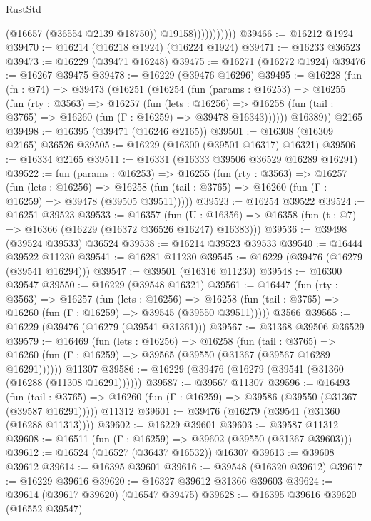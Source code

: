 \begin{lexlean}{RustStd}
\begin{coremodule}
                          (@16657 (@36554 @2139 @18750))
                          @19158)))))))))))
@39466 := @16212 @1924
@39470 := @16214 (@16218 @1924) (@16224 @1924)
@39471 := @16233 @36523
@39473 := @16229 (@39471 @16248)
@39475 := @16271 (@16272 @1924)
@39476 := @16267 @39475
@39478 := @16229 (@39476 @16296)
@39495 := @16228
    (fun (fn : @74) =>
    @39473
      (@16251
        (@16254
          (fun (params : @16253) =>
          @16255
            (fun (rty : @3563) =>
            @16257
              (fun (lets : @16256) =>
              @16258 (fun (tail : @3765) => @16260 (fun (Γ : @16259) => @39478 @16343))))))
        @16389))
    @2165
@39498 := @16395 (@39471 (@16246 @2165))
@39501 := @16308 (@16309 @2165) @36526
@39505 := @16229 (@16300 (@39501 @16317) @16321)
@39506 := @16334 @2165
@39511 := @16331 (@16333 @39506 @36529 @16289 @16291)
@39522 := fun (params : @16253) =>
  @16255
    (fun (rty : @3563) =>
    @16257
      (fun (lets : @16256) =>
      @16258 (fun (tail : @3765) => @16260 (fun (Γ : @16259) => @39478 (@39505 @39511)))))
@39523 := @16254 @39522
@39524 := @16251 @39523
@39533 := @16357
    (fun (U : @16356) => @16358 (fun (t : @7) => @16366 (@16229 (@16372 @36526 @16247) @16383)))
@39536 := @39498 (@39524 @39533) @36524
@39538 := @16214 @39523 @39533
@39540 := @16444 @39522 @11230
@39541 := @16281 @11230
@39545 := @16229 (@39476 (@16279 (@39541 @16294)))
@39547 := @39501 (@16316 @11230)
@39548 := @16300 @39547
@39550 := @16229 (@39548 @16321)
@39561 := @16447
    (fun (rty : @3563) =>
    @16257
      (fun (lets : @16256) =>
      @16258 (fun (tail : @3765) => @16260 (fun (Γ : @16259) => @39545 (@39550 @39511)))))
    @3566
@39565 := @16229 (@39476 (@16279 (@39541 @31361)))
@39567 := @31368 @39506 @36529
@39579 := @16469
    (fun (lets : @16256) =>
    @16258
      (fun (tail : @3765) =>
      @16260 (fun (Γ : @16259) => @39565 (@39550 (@31367 (@39567 @16289 @16291))))))
    @11307
@39586 := @16229 (@39476 (@16279 (@39541 (@31360 (@16288 (@11308 @16291))))))
@39587 := @39567 @11307
@39596 := @16493
    (fun (tail : @3765) => @16260 (fun (Γ : @16259) => @39586 (@39550 (@31367 (@39587 @16291)))))
    @11312
@39601 := @39476 (@16279 (@39541 (@31360 (@16288 @11313))))
@39602 := @16229 @39601
@39603 := @39587 @11312
@39608 := @16511 (fun (Γ : @16259) => @39602 (@39550 (@31367 @39603)))
@39612 := @16524 (@16527 (@36437 @16532)) @16307
@39613 := @39608 @39612
@39614 := @16395 @39601
@39616 := @39548 (@16320 @39612)
@39617 := @16229 @39616
@39620 := @16327 @39612 @31366 @39603
@39624 := @39614 (@39617 @39620) (@16547 @39475)
@39628 := @16395 @39616 @39620 (@16552 @39547)

\end{coremodule}
\end{lexlean}
